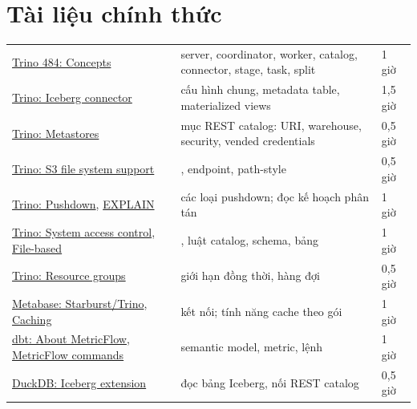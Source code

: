 \section{Tài liệu chính thức}
\begin{xltabular}{\textwidth}{@{}P{4.2cm} L P{1.8cm}@{}}
\toprule
{} &  &  \\
\midrule
\endhead
\bottomrule
\endfoot
\href{https://trino.io/docs/current/overview/concepts.html}{Trino 484: Concepts} & server, coordinator, worker, catalog, connector, stage, task, split & 1 giờ \\
\href{https://trino.io/docs/current/connector/iceberg.html}{Trino: Iceberg connector} & cấu hình chung, metadata table, materialized views & 1,5 giờ \\
\href{https://trino.io/docs/current/object-storage/metastores.html}{Trino: Metastores} & mục REST catalog: URI, warehouse, security, vended credentials & 0,5 giờ \\
\href{https://trino.io/docs/current/object-storage/file-system-s3.html}{Trino: S3 file system support} & , endpoint, path-style & 0,5 giờ \\
\href{https://trino.io/docs/current/optimizer/pushdown.html}{Trino: Pushdown}, \href{https://trino.io/docs/current/sql/explain.html}{EXPLAIN} & các loại pushdown; đọc kế hoạch phân tán & 1 giờ \\
\href{https://trino.io/docs/current/security/built-in-system-access-control.html}{Trino: System access control}, \href{https://trino.io/docs/current/security/file-system-access-control.html}{File-based} & , luật catalog, schema, bảng & 1 giờ \\
\href{https://trino.io/docs/current/admin/resource-groups.html}{Trino: Resource groups} & giới hạn đồng thời, hàng đợi & 0,5 giờ \\
\href{https://www.metabase.com/docs/latest/databases/connections/starburst}{Metabase: Starburst/Trino}, \href{https://www.metabase.com/docs/latest/configuring-metabase/caching}{Caching} & kết nối; tính năng cache theo gói & 1 giờ \\
\href{https://docs.getdbt.com/docs/build/about-metricflow}{dbt: About MetricFlow}, \href{https://docs.getdbt.com/docs/build/metricflow-commands}{MetricFlow commands} & semantic model, metric, lệnh  & 1 giờ \\
\href{https://duckdb.org/docs/2.0/core_extensions/iceberg/overview.html}{DuckDB: Iceberg extension} & đọc bảng Iceberg, nối REST catalog & 0,5 giờ \\
\end{xltabular}

